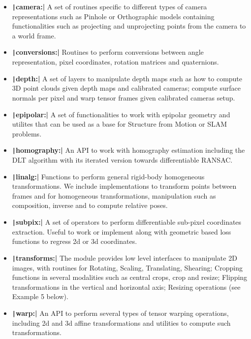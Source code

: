 \begin{itemize}
    \item \textbf{\texttt|camera:|} A set of routines specific to different types of camera representations such as Pinhole or Orthographic models containing functionalities such as projecting and unprojecting points from the camera to a world frame.
    \item \textbf{\texttt|conversions:|} Routines to perform conversions between angle representation, pixel coordinates, rotation matrices and quaternions.
    \item \textbf{\texttt|depth:|} A set of layers to manipulate depth maps such as how to compute 3D point clouds given depth maps and calibrated cameras; compute  surface normals per pixel and warp tensor frames given calibrated cameras setup.
    \item \textbf{\texttt|epipolar:|} A set of functionalities to work with epipolar geometry and utilites that can be used as a base for Structure from Motion or SLAM problems.
    \item \textbf{\texttt|homography:|} An API to work with homography estimation including the DLT algorithm with its iterated version towards differentiable RANSAC. 
    \item \textbf{\texttt|linalg:|} Functions to perform general rigid-body homogeneous transformations. We include implementations to transform points between frames and for homogeneous transformations, manipulation such as composition, inverse and to compute relative poses.
    \item \textbf{\texttt|subpix:|} A set of operators to perform differentiable sub-pixel coordinates extraction. Useful to work or implement along with geometric based loss functions to regress 2d or 3d coordinates.
    \item \textbf{\texttt|transforms:|} The module provides low level interfaces to manipulate 2D images,  with routines for Rotating, Scaling, Translating, Shearing; Cropping functions in several modalities such as central crops, crop and resize; Flipping transformations in the vertical and horizontal axis; Resizing operations (see Example 5 below).
    \item \textbf{\texttt|warp:|} An API to perform several types of tensor warping operations, including 2d and 3d affine transformations and utilities to compute such transformations.
\end{itemize}

